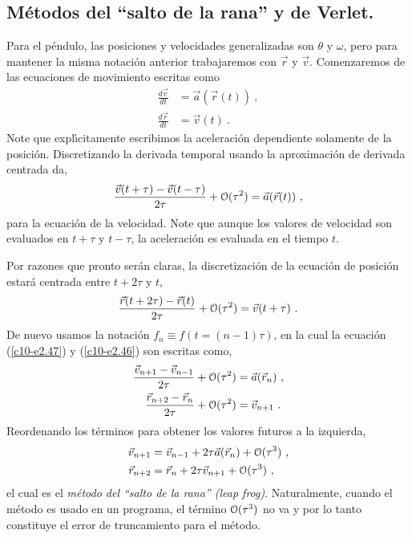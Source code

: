 \subsection{M{\'e}todos del ``salto de la rana'' y de Verlet.}

Para el p{\'e}ndulo, las posiciones y velocidades generalizadas son $\theta$ y
$\omega$, pero para mantener la misma notaci{\'o}n anterior trabajaremos con $\vec
r$ y $\vec v$. Comenzaremos de las ecuaciones de movimiento escritas
como 
\begin{align}
\label{c10-e2.44}
\frac{d\vec v}{dt} &= \vec a(\vec r(t))\ ,\\
\label{c10-e2.45}
\frac{d\vec r}{dt} &= \vec v(t)\ .
\end{align}
Note que expl{\'\i}citamente escribimos la aceleraci{\'o}n dependiente
solamente de la posici{\'o}n. Discretizando la derivada temporal usando la
aproximaci{\'o}n de derivada centrada da,
\begin{equation}
\label{c10-e2.46}
\frac {\vec v(t+\tau)- \vec v(t-\tau)}{2\tau}+\EuScript{O}(\tau^2)=\vec a(\vec
r(t))\ ,
\end{equation}
para la ecuaci{\'o}n de la velocidad. Note que aunque los valores de
velocidad son evaluados en $t+\tau$ y $t-\tau$, la aceleraci{\'o}n es evaluada
en el tiempo $t$.

Por razones que pronto ser{\'a}n claras, la discretizaci{\'o}n de la ecuaci{\'o}n
de posici{\'o}n estar{\'a} centrada entre $t+2\tau$ y $t$, 
\begin{equation}
\label{c10-e2.47}
\frac{\vec r(t+2\tau)- \vec r(t)}{2\tau}+\EuScript{O}(\tau^2)=\vec v(t+\tau)\ .
\end{equation}
De nuevo usamos la notaci{\'o}n $f_n\equiv f(t=(n-1)\tau)$, en la cual la
ecuaci{\'o}n (\ref{c10-e2.47}) y (\ref{c10-e2.46}) son escritas como, 
\begin{align}
\label{c10-e2.48}
\frac {\vec v_{n+1}- \vec v_{n-1}}{2\tau}+\EuScript{O}(\tau^2)&=\vec a(\vec r_n)\ ,\\
\label{c10-e2.49}
\frac{\vec r_{n+2}- \vec r_n}{2\tau}+\EuScript{O}(\tau^2)&=\vec v_{n+1}\ .
\end{align}
Reordenando los t{\'e}rminos para obtener los valores futuros a la
izquierda, 
\begin{align}
\label{c10-e2.50}
\vec v_{n+1}&= \vec v_{n-1}+2\tau\vec a(\vec r_n)+ \EuScript{O}(\tau^3)\ ,\\
\label{c10-e2.51}
\vec r_{n+2} &=\vec r_n + 2\tau\vec v_{n+1}+\EuScript{O}(\tau^3)\ ,
\end{align}
el cual es el {\em m{\'e}todo del ``salto de la rana'' (leap frog)}.
Naturalmente, cuando el m{\'e}todo es usado en un programa, el t{\'e}rmino
$\EuScript{O}(\tau^3)$ no va y por lo tanto constituye el error de
truncamiento para el m{\'e}todo.

